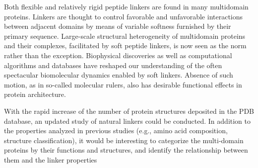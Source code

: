 Both flexible and relatively rigid peptide linkers are found in many multidomain proteins. 
Linkers are thought to control favorable and unfavorable interactions between adjacent domains by means of variable softness
furnished by their primary sequence. Large-scale structural heterogeneity of multidomain proteins
and their complexes, facilitated by soft peptide linkers, is now seen as the norm rather than the
exception. Biophysical discoveries as well as computational algorithms and databases have
reshaped our understanding of the often spectacular biomolecular dynamics enabled by soft linkers.
Absence of such motion, as in so-called molecular rulers, also has desirable functional effects in
protein architecture.





With the rapid increase of the number of protein structures deposited in the PDB database, an updated study of natural linkers could be conducted. 
In addition to the properties analyzed in previous studies (e.g., amino acid composition, structure classification), 
it would be interesting to categorize the multi-domain proteins by their functions and structures, and identify the relationship between them and the linker properties




